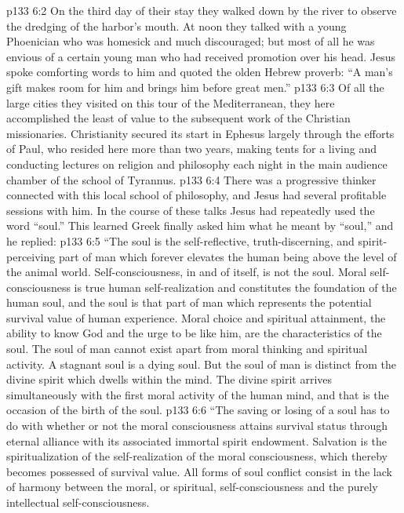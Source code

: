 \vs p133 6:2 On the third day of their stay they walked down by the river to observe the dredging of the harbor’s mouth. At noon they talked with a young Phoenician who was homesick and much discouraged; but most of all he was envious of a certain young man who had received promotion over his head. Jesus spoke comforting words to him and quoted the olden Hebrew proverb: \textcolor{ubdarkred}{“A man’s gift makes room for him and brings him before great men.”}
\vs p133 6:3 Of all the large cities they visited on this tour of the Mediterranean, they here accomplished the least of value to the subsequent work of the Christian missionaries. Christianity secured its start in Ephesus largely through the efforts of Paul, who resided here more than two years, making tents for a living and conducting lectures on religion and philosophy each night in the main audience chamber of the school of Tyrannus.
\vs p133 6:4 There was a progressive thinker connected with this local school of philosophy, and Jesus had several profitable sessions with him. In the course of these talks Jesus had repeatedly used the word “soul.” This learned Greek finally asked him what he meant by “soul,” and he replied:
\pc \vs p133 6:5 \textcolor{ubdarkred}{“The soul is the self\hyp{}reflective, truth\hyp{}discerning, and spirit\hyp{}perceiving part of man which forever elevates the human being above the level of the animal world. Self\hyp{}consciousness, in and of itself, is not the soul. Moral self\hyp{}consciousness is true human self\hyp{}realization and constitutes the foundation of the human soul, and the soul is that part of man which represents the potential survival value of human experience. Moral choice and spiritual attainment, the ability to know God and the urge to be like him, are the characteristics of the soul. The soul of man cannot exist apart from moral thinking and spiritual activity. A stagnant soul is a dying soul. But the soul of man is distinct from the divine spirit which dwells within the mind. The divine spirit arrives simultaneously with the first moral activity of the human mind, and that is the occasion of the birth of the soul.}\plusone
\vs p133 6:6 \textcolor{ubdarkred}{“The saving or losing of a soul has to do with whether or not the moral consciousness attains survival status through eternal alliance with its associated immortal spirit endowment. Salvation is the spiritualization of the self\hyp{}realization of the moral consciousness, which thereby becomes possessed of survival value. All forms of soul conflict consist in the lack of harmony between the moral, or spiritual, self\hyp{}consciousness and the purely intellectual self\hyp{}consciousness.}
